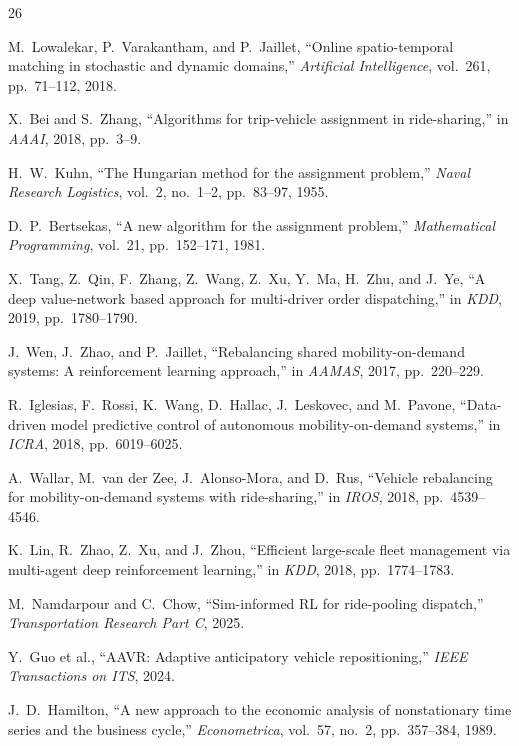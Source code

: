 \documentclass[conference,10pt]{IEEEtran}
\begin{document}
\begin{thebibliography}{26}

M.~Lowalekar, P.~Varakantham, and P.~Jaillet,
``Online spatio-temporal matching in stochastic and dynamic domains,''
\emph{Artificial Intelligence}, vol.~261, pp.~71--112, 2018.

X.~Bei and S.~Zhang,
``Algorithms for trip-vehicle assignment in ride-sharing,''
in \emph{AAAI}, 2018, pp.~3--9.

H.~W.~Kuhn,
``The Hungarian method for the assignment problem,''
\emph{Naval Research Logistics}, vol.~2, no.~1--2, pp.~83--97, 1955.

D.~P.~Bertsekas,
``A new algorithm for the assignment problem,''
\emph{Mathematical Programming}, vol.~21, pp.~152--171, 1981.

X.~Tang, Z.~Qin, F.~Zhang, Z.~Wang, Z.~Xu, Y.~Ma, H.~Zhu, and J.~Ye,
``A deep value-network based approach for multi-driver order dispatching,''
in \emph{KDD}, 2019, pp.~1780--1790.

J.~Wen, J.~Zhao, and P.~Jaillet,
``Rebalancing shared mobility-on-demand systems: A reinforcement learning approach,''
in \emph{AAMAS}, 2017, pp.~220--229.

R.~Iglesias, F.~Rossi, K.~Wang, D.~Hallac, J.~Leskovec, and M.~Pavone,
``Data-driven model predictive control of autonomous mobility-on-demand systems,''
in \emph{ICRA}, 2018, pp.~6019--6025.

A.~Wallar, M.~van der Zee, J.~Alonso-Mora, and D.~Rus,
``Vehicle rebalancing for mobility-on-demand systems with ride-sharing,''
in \emph{IROS}, 2018, pp.~4539--4546.

K.~Lin, R.~Zhao, Z.~Xu, and J.~Zhou,
``Efficient large-scale fleet management via multi-agent deep reinforcement learning,''
in \emph{KDD}, 2018, pp.~1774--1783.

M.~Namdarpour and C.~Chow,
``Sim-informed RL for ride-pooling dispatch,''
\emph{Transportation Research Part C}, 2025.

Y.~Guo et al.,
``AAVR: Adaptive anticipatory vehicle repositioning,''
\emph{IEEE Transactions on ITS}, 2024.

J.~D.~Hamilton,
``A new approach to the economic analysis of nonstationary time series and the business cycle,''
\emph{Econometrica}, vol.~57, no.~2, pp.~357--384, 1989.


\end{thebibliography}
\end{document}
